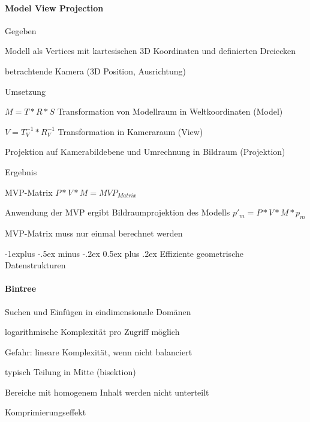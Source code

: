 \documentclass[landscape]{article}
\makeatletter
\renewcommand{\subsection}{\@startsection{subsection}{2}{0mm}%
                                {-1explus -.5ex minus -.2ex}%
                                {0.5ex plus .2ex}%
                                {\normalfont\normalsize\bfseries}}
\makeatother
\begin{document}
\begin{multicols}{3}
  \paragraph{Model View Projection}
  \begin{itemize*}
    \item Gegeben
    \begin{itemize*}
      \item Modell als Vertices mit kartesischen 3D Koordinaten und definierten Dreiecken
      \item betrachtende Kamera (3D Position, Ausrichtung)
    \end{itemize*}
    \item Umsetzung
    \begin{enumerate*}
      \item $M=T*R*S$ Transformation von Modellraum in Weltkoordinaten (Model)
      \item $V=T_V^{-1}*R_V^{-1}$ Transformation in Kameraraum (View)
      \item Projektion auf Kamerabildebene und Umrechnung in Bildraum (Projektion)
    \end{enumerate*}
    \item Ergebnis
    \begin{itemize*}
      \item MVP-Matrix $P*V*M=MVP_{Matrix}$
      \item Anwendung der MVP ergibt Bildraumprojektion des Modells $p'_m=P*V*M*p_m$
      \item MVP-Matrix muss nur einmal berechnet werden
    \end{itemize*}
  \end{itemize*}
  
  \subsection{Effiziente geometrische Datenstrukturen}
  \paragraph{Bintree}
  \begin{itemize*}
    \item Suchen und Einfügen in eindimensionale Domänen
    \item logarithmische Komplexität pro Zugriff möglich
    \item Gefahr: lineare Komplexität, wenn nicht balanciert
    \item typisch Teilung in Mitte (bisektion)
    \item Bereiche mit homogenem Inhalt werden nicht unterteilt
    \item Komprimierungseffekt
  \end{itemize*}
  

\end{multicols}
\end{document}
